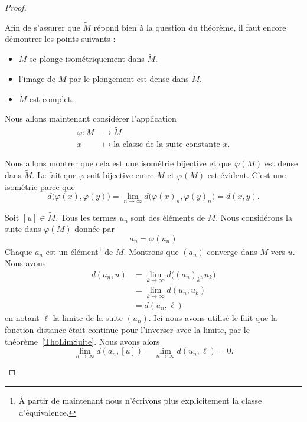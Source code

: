 \begin{proof}
\begin{subproof}
		Afin de s'assurer que \( \tilde M\) répond bien à la question du théorème, il faut encore démontrer les points suivants :
		\begin{itemize}
			\item \( M\) se plonge isométriquement dans \( \tilde M\).
			\item l'image de \( M\) par le plongement est dense dans \( \tilde M\).
			\item \( \tilde M\) est complet.
		\end{itemize}

		Nous allons maintenant considérer l'application
		\begin{equation}
			\begin{aligned}
				\varphi\colon M & \to \tilde M                                              \\
				x               & \mapsto \text{la classe de la suite constante } x\text{.}
			\end{aligned}
		\end{equation}
		\begin{subproof}
			Nous allons montrer que cela est une isométrie bijective et que \( \varphi(M)\) est dense dans \( \tilde M\). Le fait que \( \varphi\) soit bijective entre \( M\) et \( \varphi(M)\) est évident. C'est une isométrie parce que
			\begin{equation}
				d\big( \varphi(x),\varphi(y) \big)=\lim_{n\to \infty} d\big(\varphi(x)_n,\varphi(y)_n\big)=d(x,y).
			\end{equation}

			\spitem[Densité]

			Soit \( [u]\in \tilde M\). Tous les termes \( u_n\) sont des éléments de \( M\). Nous considérons la suite dans \( \varphi(M)\) donnée par
			\begin{equation}
				a_n=\varphi(u_n)
			\end{equation}
			Chaque \( a_n\) est un élément\footnote{À partir de maintenant nous n'écrivons plus explicitement la classe d'équivalence.} de \( \tilde M\). Montrons que \( (a_n)\) converge dans \( \tilde M\) vers \( u\). Nous avons
			\begin{subequations}
				\begin{align}
					d(a_n,u) & =\lim_{k\to \infty} d\big( (a_n)_k,u_k \big) \\
					         & =\lim_{k\to \infty} d(u_n,u_k)               \\
					         & =d(u_n,\ell)
				\end{align}
			\end{subequations}
			en notant \( \ell\) la limite de la suite \( (u_n)\). Ici nous avons utilisé le fait que la fonction distance était continue pour l'inverser avec la limite, par le théorème~\ref{ThoLimSuite}. Nous avons alors
			\begin{equation}
				\lim_{n\to \infty} d(a_n,[u])=\lim_{n\to \infty} d(u_n,\ell)=0.
			\end{equation}


\end{subproof}
\end{subproof}
\end{proof}
